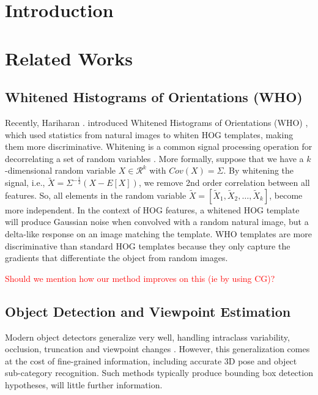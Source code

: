 \documentclass[10pt,twocolumn,letterpaper]{article}
\begin{document}
\section{Introduction}
\label{sec:intro}


\section{Related Works}
\subsection{Whitened Histograms of Orientations (WHO)}
Recently, Hariharan \etal. introduced Whitened Histograms of Orientations (WHO) \cite{Hariharan12}, which used statistics from natural images to whiten HOG templates, making them more discriminative. Whitening is a common signal processing operation for decorrelating a set of random variables \cite{Martinsson05, Belouchrani00}. More formally, suppose that we have a $k$-dimensional random variable $X \in \mathcal{R}^k$ with $Cov(X)=\Sigma$. By whitening the signal, i.e., $\tilde{X}=\Sigma^{-\frac{1}{2}}(X - E[X])$, we remove 2nd order correlation between all features. So, all elements in the random variable $\tilde{X} = \left[\tilde{X}_1, \tilde{X}_2, \dots, \tilde{X}_k\right]$, become more independent. In the context of HOG features, a whitened HOG template will produce Gaussian noise when convolved with a random natural image, but a delta-like response on an image matching the template. WHO templates are more discriminative than standard HOG templates because they only capture the gradients that differentiate the object from random images.

\textcolor{red}{Should we mention how our method improves on this (ie by using CG)?}


\subsection{Object Detection and Viewpoint Estimation}

Modern object detectors generalize very well, handling intraclass variability, occlusion, truncation and viewpoint changes \cite{Felzenszwalb10, Girshick14}. However, this generalization comes at the cost of fine-grained information, including accurate 3D pose and object sub-category recognition. Such methods typically produce bounding box detection hypotheses, will little further information.
\end{document}
